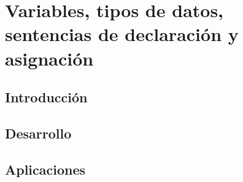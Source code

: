 \chapter{Variables, tipos de datos, sentencias de declaración y asignación}
\section{Introducción}

%
\section{Desarrollo}

%
\section{Aplicaciones}

%
%